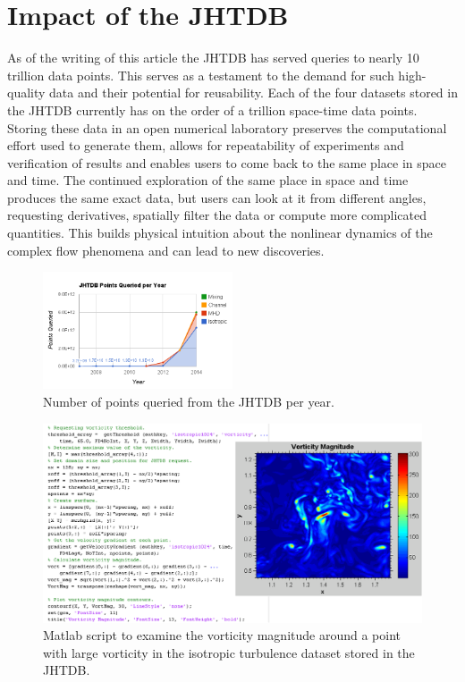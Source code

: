 \documentclass[10pt,twocolumn]{article}
\begin{document}
\section{Impact of the JHTDB}

As of the writing of this article the JHTDB has served queries to nearly 10 trillion data points. This serves as a testament to the demand for such high-quality
data and their potential for reusability. Each of the four datasets stored in the JHTDB currently has on the order of a trillion space-time data points. Storing
these data in an open numerical laboratory preserves the computational effort used to generate them, allows for repeatability of experiments and verification of
results and enables users to come back to the same place in space and time. The continued exploration of the same place in space and time produces
the same exact data, but users can look at it from different angles, requesting derivatives, spatially filter the data or compute more complicated quantities. 
This builds physical intuition about the nonlinear dynamics of the complex flow phenomena and can lead to new discoveries. 

\begin{figure}
\includegraphics[width=0.5\textwidth]{jhtdb_usage.png}
\caption{Number of points queried from the JHTDB per year.}
\label{fig:points_queried}
\end{figure}

\begin{figure}
\includegraphics[width=1.0\textwidth]{vorticity.png}
\caption{Matlab script to examine the vorticity magnitude around a point with large vorticity in the isotropic turbulence dataset stored in the JHTDB.}
\label{fig:vorticity}
\end{figure}
\end{document}
